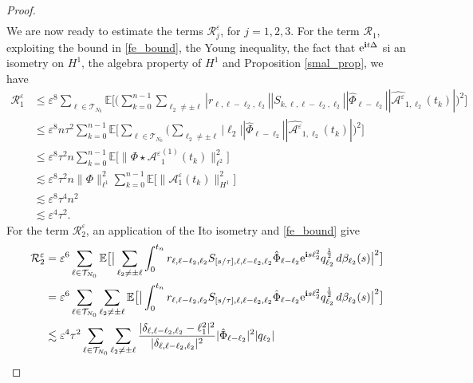 \documentclass[a4paper]{amsart}
\begin{document}
\begin{proof}
\begin{align}
\end{align}
We are now ready to estimate the terms $\mathcal{R}^\varepsilon_j$, for $j=1,2,3$. For the term $\mathcal{R}_1$, exploiting the bound in \eqref{fe_bound}, the Young inequality, the fact that ${\rm e}^{{\bf i}t\Delta}$ si an isometry on $H^1$, the algebra property of $H^1$ and Proposition \ref{smal_prop}, we have
\begin{align*}
    \mathcal{R}^\varepsilon_1&\le \varepsilon^8 \sum_{\ell\in\mathcal{T}_{N_0}} \mathbb{E}\big[\big(\sum_{k=0}^{n-1} \sum_{\ell_2\ne \pm \ell} |r_{\ell,\ell-\ell_2,\ell_2}| |S_{k,\ell,\ell-\ell_2,\ell_2}| |\hat{\Phi}_{\ell-\ell_2}| |\widehat{\mathcal{A}^\varepsilon}_{1,\ell_2}(t_k)|\big)^2\big]\\
    &\le  \varepsilon^8 n \tau^2 \sum_{k=0}^{n-1} \mathbb{E} \big[\sum_{\ell\in\mathcal{T}_{N_0}}\big(\sum_{\ell_2\ne \pm \ell}|\ell_2| |\hat{\Phi}_{\ell-\ell_2}| |\widehat{\mathcal{A}^\varepsilon}_{1,\ell_2}(t_k)|\big)^2\big]\\
    &\le \varepsilon^8 \tau^2 n \sum_{k=0}^{n-1}\mathbb{E}\big[\|\Phi\star {\mathcal{A}^\varepsilon}_1^{(1)}(t_k)\|^2_{\ell^2}]\\
    &\lesssim  \varepsilon^8 \tau^2 n \|\Phi\|_{\ell^1}^2\sum_{k=0}^{n-1} \mathbb{E}\big[\|\mathcal{A}^\varepsilon_1(t_k)\|^2_{H^1}\big]\\
    &\lesssim \varepsilon^8 \tau^4 n^2\\
    &\lesssim \varepsilon^4 \tau^2.
\end{align*}
For the term $\mathcal{R}^\varepsilon_2$, an application of the Ito isometry and \eqref{fe_bound} give
\begin{align*}
\mathcal{R}^\varepsilon_2&=\varepsilon^6  \sum_{\ell\in \mathcal{T}_{N_0}}\mathbb{E}\big[\big|\displaystyle\sum_{\ell_2 \ne \pm\ell} \int_0^{t_n} r_{\ell,\ell-\ell_2,\ell_2}S_{[s/\tau],\ell,\ell-\ell_2,\ell_2}\hat{\Phi}_{\ell-\ell_2} {\rm e}^{{\bf i}s \ell_2^2}q_{\ell_2}^{\frac{1}{2}}\,d\beta_{\ell_2}(s)\big|^2\big]\\
&=\varepsilon^6  \sum_{\ell\in \mathcal{T}_{N_0}}\displaystyle\sum_{\ell_2 \ne \pm\ell} \mathbb{E}\big[\big| \int_0^{t_n} r_{\ell,\ell-\ell_2,\ell_2}S_{[s/\tau],\ell,\ell-\ell_2,\ell_2}\hat{\Phi}_{\ell-\ell_2} {\rm e}^{{\bf i}s \ell_2^2}q_{\ell_2}^{\frac{1}{2}}\,d\beta_{\ell_2}(s)\big|^2\big]\\
&\lesssim\varepsilon^4 \tau^2 \sum_{\ell\in \mathcal{T}_{N_0}}\displaystyle\sum_{\ell_2 \ne \pm\ell} \frac{|\delta_{\ell,\ell-\ell_2,\ell_2}-\ell_1^2|^2}{|\delta_{\ell,\ell-\ell_2,\ell_2}|^2}
|\hat{\Phi}_{\ell-\ell_2}|^2|q_{\ell_2}|\\

\end{align*}
\end{proof}
\end{document}
